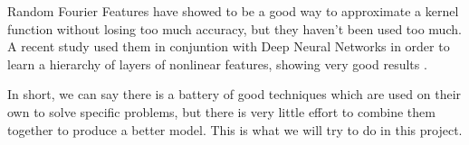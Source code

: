 \documentclass{article}
\begin{document}
    Random Fourier Features have showed to be a good way to approximate a kernel
    function without losing too much accuracy, but they haven't been used too
    much. A recent study used them in conjuntion with Deep Neural Networks in order to
    learn a hierarchy of layers of nonlinear features, showing very good
    results \cite{zhangs17}.

    In short, we can say there is a battery of good techniques which are used on
    their own to solve specific problems, but there is very little effort to
    combine them together to produce a better model. This is what we will try
    to do in this project.

\end{document}
